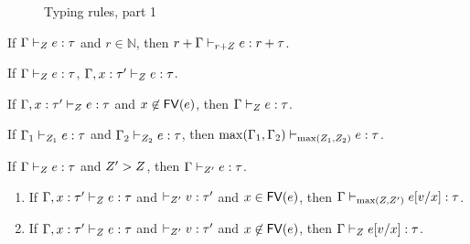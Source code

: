 \begin{figure}
  \caption{Typing rules, part 1}
  \label{fig:type-rules}
\end{figure}

\begin{thm}
  If $ \Gamma \vdash_{ Z} e : \tau $ and $r \in \mathbb{N}$,
  then $ r+\Gamma \vdash_{ r+ Z} e : r+ \tau $.
\end{thm}

\begin{thm}
  If $ \Gamma \vdash_{ Z} e : \tau $,  $ \Gamma,x : \tau' \vdash_{ Z} e : \tau $.
\end{thm}

\begin{thm}
  If $ \Gamma,x : \tau' \vdash_{ Z} e : \tau $ and $x \not
 \in \mathsf{FV} (e) $, then $ \Gamma  \vdash_{ Z} e : \tau $.
\end{thm}

\begin{thm}
  If $ \Gamma_1 \vdash_{ Z_1} e : \tau $ and $ \Gamma_2 \vdash_{ Z_2} e : \tau $,
  then $\max(\Gamma_1,\Gamma_2) \vdash_{\max( Z_1 , Z_2 )} e : \tau $.
\end{thm}

\begin{thm}
   If $ \Gamma \vdash_{ Z} e : \tau $ and $Z' >
   Z$, then $ \Gamma \vdash_{ Z'} e : \tau $.
\end{thm}

\begin{thm}[Substitution]
  \begin{enumerate} 
   \item If $ \Gamma,x : \tau' \vdash_{ Z} e : \tau $ and $
  \empty \tvdash{\nnatA'} \valr : \type'  $ and $ x \in \mathsf{FV} (e) $,  then  $\Gamma
  \vdash_{\max(Z,Z' )} e[v/x]  : \tau$. 
  \item If $ \Gamma,x : \tau' \vdash_{ Z} e : \tau $ and $
  \empty \tvdash{\nnatA'} \valr : \type'  $ and $ x \not \in \mathsf{FV} (e) $,  then  $\Gamma
  \vdash_{Z } e[v/x]  : \tau$.
  \end{enumerate}
\end{thm}

